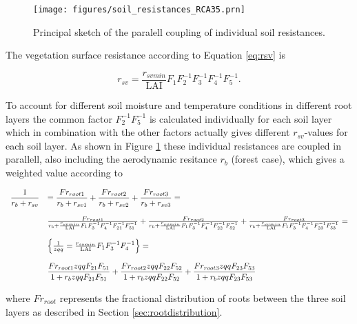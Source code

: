 

\begin{figure}[!tbp]
\centerline{
 \texttt{[image: figures/soil\_resistances\_RCA35.prn]}}
\caption{Principal sketch of the paralell coupling of individual soil resistances.}
\label{soilsurfres}
\end{figure}

The vegetation surface resistance according to Equation \ref{eq:rsv} is

\begin{equation}
  \label{eq:rsvb}
  r_{sv} = \frac{r_{svmin}}{\mathrm{LAI}} F_1 F_2^{-1} F_3^{-1} F_4^{-1} F_5^{-1}.
\end{equation}

To account for different
soil moisture and temperature conditions in different root layers the common factor $F_2^{-1} F_5^{-1}$ is calculated
individually for each soil layer which in combination with the other factors actually gives
different $r_{sv}$-values for each soil layer. As shown in Figure \ref{soilsurfres} these individual
resistances are coupled in parallell, also including the aerodynamic resitance $r_b$ (forest case),
which gives a weighted value according to

\begin{equation}
\label{eq:rsvweight}
\begin{array}{ll}
  \displaystyle \frac{1}{r_b + r_{sv}} & = \displaystyle \frac{Fr_{root1}}{r_b + r_{sv1}} + \displaystyle \frac{Fr_{root2}}{r_b + r_{sv2}} + \displaystyle \frac{Fr_{root3}}{r_b + r_{sv3}} = \\
\ \\
 & \frac{Fr_{root1}}{r_b + \frac{r_{svmin}}{\mathrm{LAI}} F_1 F_3^{-1} F_4^{-1} F_{21}^{-1} F_{51}^{-1}} +
\frac{Fr_{root2}}{r_b + \frac{r_{svmin}}{\mathrm{LAI}} F_1 F_3^{-1} F_4^{-1} F_{22}^{-1} F_{52}^{-1}} +
\frac{Fr_{root3}}{r_b + \frac{r_{svmin}}{\mathrm{LAI}} F_1 F_3^{-1} F_4^{-1} F_{23}^{-1} F_{53}^{-1}} = \\
\ \\
 & \left\{ \frac{1}{zqq}= \frac{r_{svmin}}{\mathrm{LAI}} F_1 F_3^{-1} F_4^{-1} \right\} = \\
\ \\
 & \displaystyle \frac{Fr_{root1} zqq F_{21} F_{51}}{1+r_b zqq F_{21} F_{51}} + 
 \displaystyle \frac{Fr_{root2} zqq F_{22} F_{52}}{1+r_b zqq F_{22} F_{52}} +
 \displaystyle \frac{Fr_{root3} zqq F_{23} F_{53}}{1+r_b zqq F_{23} F_{53}} \\
\end{array}
\end{equation}

where $Fr_{root}$ represents the fractional distribution of roots between the three soil layers
as described in Section \ref{sec:rootdistribution}. 

